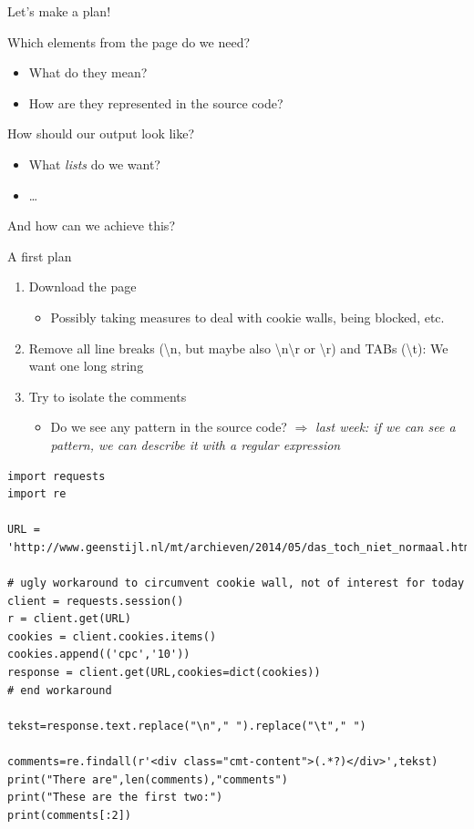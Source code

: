 \documentclass{beamer}
\begin{document}
\begin{frame}{Let's make a plan!}
\begin{block}{Which elements from the page do we need?}
\begin{itemize}
\item What do they mean?
\item How are they represented in the source code?
\end{itemize}
\end{block}
\begin{block}{How should our output look like?}
\begin{itemize}
\item What \emph{lists} do we want?
\item \ldots
\end{itemize}
\end{block}
And how can we achieve this?
\end{frame}


\begin{frame}{}
\begin{block}{A first plan}
\begin{enumerate}
\item<2-> Download the page
   \begin{itemize}
   \item<3-> Possibly taking measures to deal with cookie walls, being blocked, etc.
   \end{itemize}
\item<4-> Remove all line breaks (\textbackslash n, but maybe also \textbackslash n\textbackslash r or \textbackslash r) and TABs (\textbackslash t): We want one long string
\item<5-> Try to isolate the comments
   \begin{itemize}
   	\item<5-> Do we see any pattern in the source code? $\Rightarrow$ \emph{last week: if we can see a pattern, we can describe it with a regular expression}
   \end{itemize}
\end{enumerate}
\end{block}

\end{frame}

\begin{frame}
\begin{lstlisting}
import requests
import re

URL = 'http://www.geenstijl.nl/mt/archieven/2014/05/das_toch_niet_normaal.html'

# ugly workaround to circumvent cookie wall, not of interest for today
client = requests.session()
r = client.get(URL)
cookies = client.cookies.items()
cookies.append(('cpc','10'))
response = client.get(URL,cookies=dict(cookies))
# end workaround

tekst=response.text.replace("\n"," ").replace("\t"," ")

comments=re.findall(r'<div class="cmt-content">(.*?)</div>',tekst)
print("There are",len(comments),"comments")
print("These are the first two:")
print(comments[:2])
\end{lstlisting}
\end{frame}
\end{document}
